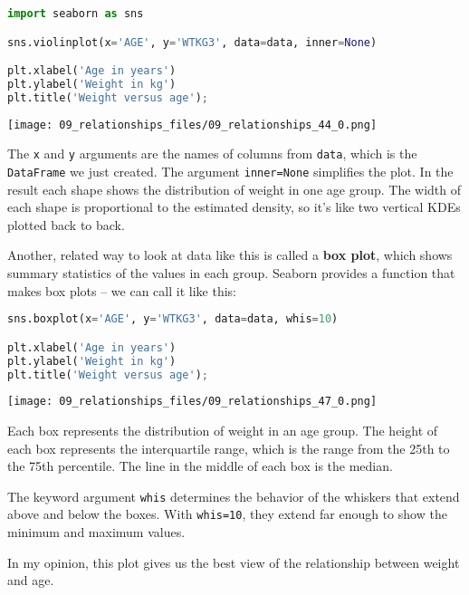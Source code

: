 \begin{lstlisting}[language=Python,style=source]
import seaborn as sns

sns.violinplot(x='AGE', y='WTKG3', data=data, inner=None)

plt.xlabel('Age in years')
plt.ylabel('Weight in kg')
plt.title('Weight versus age');
\end{lstlisting}

\begin{center}
\texttt{[image: 09\_relationships\_files/09\_relationships\_44\_0.png]}
\end{center}

The \passthrough{\lstinline!x!} and \passthrough{\lstinline!y!}
arguments are the names of columns from \passthrough{\lstinline!data!},
which is the \passthrough{\lstinline!DataFrame!} we just created. The
argument \passthrough{\lstinline!inner=None!} simplifies the plot. In
the result each shape shows the distribution of weight in one age group.
The width of each shape is proportional to the estimated density, so
it's like two vertical KDEs plotted back to back.

Another, related way to look at data like this is called a \textbf{box
plot}, which shows summary statistics of the values in each group.
Seaborn provides a function that makes box plots -- we can call it like
this:

\begin{lstlisting}[language=Python,style=source]
sns.boxplot(x='AGE', y='WTKG3', data=data, whis=10)

plt.xlabel('Age in years')
plt.ylabel('Weight in kg')
plt.title('Weight versus age');
\end{lstlisting}

\begin{center}
\texttt{[image: 09\_relationships\_files/09\_relationships\_47\_0.png]}
\end{center}

Each box represents the distribution of weight in an age group. The
height of each box represents the interquartile range, which is the
range from the 25th to the 75th percentile. The line in the middle of
each box is the median.

The keyword argument \passthrough{\lstinline!whis!} determines the
behavior of the whiskers that extend above and below the boxes. With
\passthrough{\lstinline!whis=10!}, they extend far enough to show the
minimum and maximum values.

In my opinion, this plot gives us the best view of the relationship
between weight and age.

